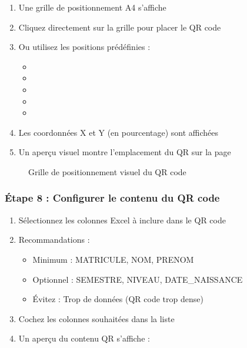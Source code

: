 \begin{enumerate}[leftmargin=*]
    \item Une grille de positionnement A4 s'affiche
    \item Cliquez directement sur la grille pour placer le QR code
    \item Ou utilisez les positions prédéfinies :
    \begin{itemize}
        \item {}
        \item {}
        \item {}
        \item {}
        \item {}
    \end{itemize}
    \item Les coordonnées X et Y (en pourcentage) sont affichées
    \item Un aperçu visuel montre l'emplacement du QR sur la page
\end{enumerate}

\begin{figure}[h]
    \centering
    \caption{Grille de positionnement visuel du QR code}
\end{figure}


\subsubsection{Étape 8 : Configurer le contenu du QR code}

\begin{enumerate}[leftmargin=*]
    \item Sélectionnez les colonnes Excel à inclure dans le QR code
    \item Recommandations :
    \begin{itemize}
        \item Minimum : MATRICULE, NOM, PRENOM
        \item Optionnel : SEMESTRE, NIVEAU, DATE\_NAISSANCE
        \item Évitez : Trop de données (QR code trop dense)
    \end{itemize}
    \item Cochez les colonnes souhaitées dans la liste
    \item Un aperçu du contenu QR s'affiche :
\end{enumerate}

